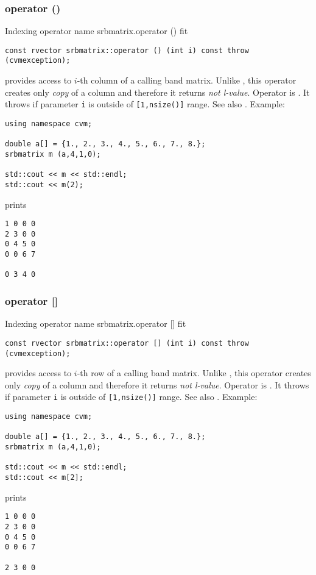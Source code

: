 \subsubsection{operator ()}
Indexing operator%
\pdfdest name {srbmatrix.operator ()} fit
\begin{verbatim}
const rvector srbmatrix::operator () (int i) const throw (cvmexception);
\end{verbatim}
provides access to \hbox{$i$-th} column of a calling band matrix.
Unlike ,
this operator creates only \emph{copy} of a column 
and therefore it returns
\emph{not  l-value}.
Operator is \Based.
It throws 
if parameter \verb"i" is outside of \verb"[1,nsize()]" range.
See also .
Example:
\begin{Verbatim}
using namespace cvm;

double a[] = {1., 2., 3., 4., 5., 6., 7., 8.};
srbmatrix m (a,4,1,0);

std::cout << m << std::endl;
std::cout << m(2);
\end{Verbatim}
prints
\begin{Verbatim}
1 0 0 0
2 3 0 0
0 4 5 0
0 0 6 7

0 3 4 0
\end{Verbatim}
\newpage



\subsubsection{operator []}
Indexing operator%
\pdfdest name {srbmatrix.operator []} fit
\begin{verbatim}
const rvector srbmatrix::operator [] (int i) const throw (cvmexception);
\end{verbatim}
provides access to  \hbox{$i$-th} row of a calling band matrix.
Unlike ,
this operator creates only  \emph{copy} of a column and therefore 
it returns
\emph{not  l-value}.
Operator is \Based.
It throws 
if  parameter \verb"i" is outside of \verb"[1,nsize()]" range.
See also .
Example:
\begin{Verbatim}
using namespace cvm;

double a[] = {1., 2., 3., 4., 5., 6., 7., 8.};
srbmatrix m (a,4,1,0);

std::cout << m << std::endl;
std::cout << m[2];
\end{Verbatim}
prints
\begin{Verbatim}
1 0 0 0
2 3 0 0
0 4 5 0
0 0 6 7

2 3 0 0
\end{Verbatim}
\newpage




